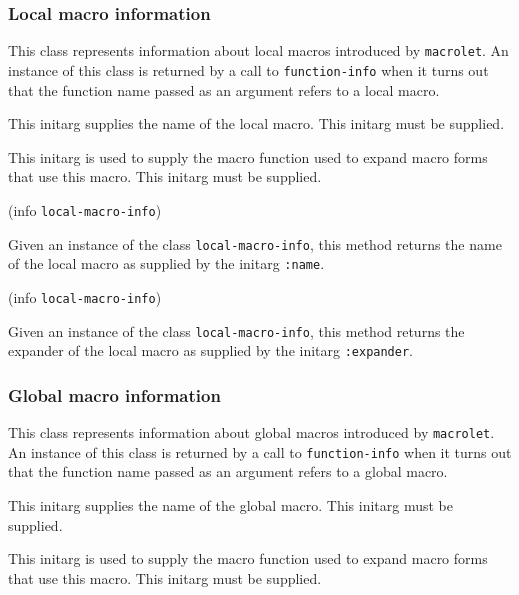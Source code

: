 \subsubsection{Local macro information}


This class represents information about local macros introduced by
\texttt{macrolet}.  An instance of this class is returned by a call to
\texttt{function-info} when it turns out that the function name passed
as an argument refers to a local macro.


This initarg supplies the name of the local macro.  This initarg
must be supplied.


This initarg is used to supply the macro function used to expand macro
forms that use this macro.  This initarg must be supplied. 

 {(info {\tt local-macro-info})}

Given an instance of the class \texttt{local-macro-info}, this
method returns the name of the local macro as supplied by the
initarg \texttt{:name}.

 {(info {\tt local-macro-info})}

Given an instance of the class \texttt{local-macro-info}, this
method returns the expander of the local macro as supplied by the
initarg \texttt{:expander}.

\subsubsection{Global macro information}


This class represents information about global macros introduced by
\texttt{macrolet}.  An instance of this class is returned by a call to
\texttt{function-info} when it turns out that the function name passed
as an argument refers to a global macro.


This initarg supplies the name of the global macro.  This initarg
must be supplied.


This initarg is used to supply the macro function used to expand macro
forms that use this macro.  This initarg must be supplied. 

